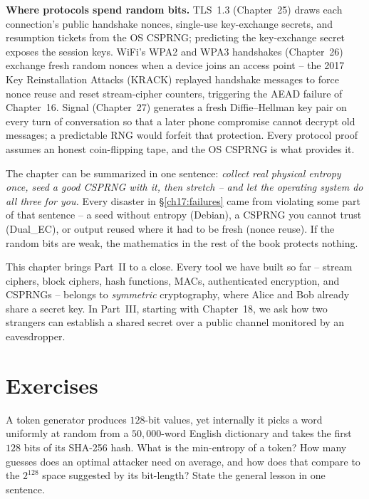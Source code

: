 \begin{applicationbox}
\textbf{Where protocols spend random bits.} TLS~1.3 (Chapter~25) draws each connection's public handshake nonces, single-use key-exchange secrets, and resumption tickets from the OS CSPRNG; predicting the key-exchange secret exposes the session keys. WiFi's WPA2 and WPA3 handshakes (Chapter~26) exchange fresh random nonces when a device joins an access point -- the 2017 Key Reinstallation Attacks (KRACK) replayed handshake messages to force nonce reuse and reset stream-cipher counters, triggering the AEAD failure of Chapter~16. Signal (Chapter~27) generates a fresh Diffie--Hellman key pair on every turn of conversation so that a later phone compromise cannot decrypt old messages; a predictable RNG would forfeit that protection. Every protocol proof assumes an honest coin-flipping tape, and the OS CSPRNG is what provides it.
\end{applicationbox}

\begin{focusbox}
The chapter can be summarized in one sentence: \emph{collect real physical entropy once, seed a good CSPRNG with it, then stretch -- and let the operating system do all three for you.} Every disaster in \S\ref{ch17:failures} came from violating some part of that sentence -- a seed without entropy (Debian), a CSPRNG you cannot trust (Dual\_EC), or output reused where it had to be fresh (nonce reuse). If the random bits are weak, the mathematics in the rest of the book protects nothing.
\end{focusbox}

\begin{connectionbox}
This chapter brings Part~II to a close. Every tool we have built so far -- stream ciphers, block ciphers, hash functions, MACs, authenticated encryption, and CSPRNGs -- belongs to \emph{symmetric} cryptography, where Alice and Bob already share a secret key. In Part~III, starting with Chapter~18, we ask how two strangers can establish a shared secret over a public channel monitored by an eavesdropper.
\end{connectionbox}

\section{Exercises}
\label{ch17:exercises}

\begin{exercise}
A token generator produces $128$-bit values, yet internally it picks a word uniformly at random from a $50{,}000$-word English dictionary and takes the first $128$ bits of its SHA-256 hash. What is the min-entropy of a token? How many guesses does an optimal attacker need on average, and how does that compare to the $2^{128}$ space suggested by its bit-length? State the general lesson in one sentence.
\end{exercise}

